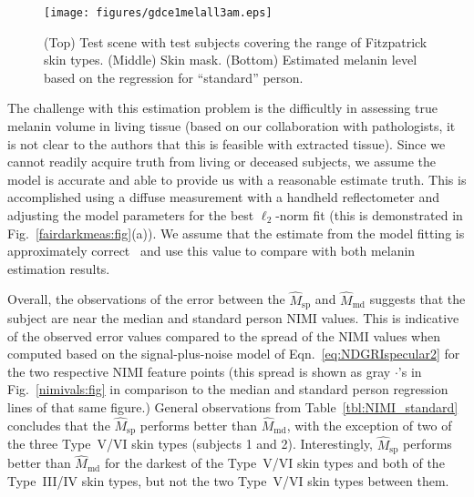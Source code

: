 \documentclass[10pt,journal,cspaper,compsoc]{IEEEtran}
\begin{document}
\begin{figure}[ht!]
\centering
\texttt{[image: figures/gdce1melall3am.eps]}
\caption{
(Top) Test scene with test subjects covering the range of Fitzpatrick skin types.
(Middle) Skin mask.
(Bottom) Estimated melanin level based on the regression for ``standard'' person.} 
\label{gdce1melall:fig}
\end{figure}

The challenge with this estimation problem is the difficultly in assessing true melanin volume in living tissue 
(based on our collaboration with pathologists, it is not clear to the authors that this is feasible with extracted tissue).  
Since we cannot readily acquire truth from living or deceased subjects, we assume the model is accurate and able to 
provide us with a reasonable estimate truth.  This is accomplished using a diffuse measurement with a handheld reflectometer
and adjusting the model parameters for the best $\ell_2$-norm fit (this is demonstrated in Fig.~\ref{fairdarkmeas:fig}(a)).  
We assume that the estimate from the model fitting is approximately correct~\cite{Nunez8} and use this value to compare with 
both melanin estimation results.

Overall, the observations of the error between the $\hat{M}_{\text{sp}}$ and $\hat{M}_{\text{md}}$ suggests that the 
subject are near the median and standard person NIMI values. This is indicative of the observed error values 
compared to the spread of the NIMI values when computed based on the signal-plus-noise model of Eqn.~\ref{eq:NDGRIspecular2} 
for the two respective NIMI feature points (this spread is shown as gray $\cdot$'s in Fig.~\ref{nimivals:fig} 
in comparison to the median and standard person regression lines of that same figure.)  General observations 
from Table~\ref{tbl:NIMI_standard} concludes that the $\hat{M}_{\text{sp}}$ performs better than $\hat{M}_{\text{md}}$, with 
the exception of two of the three Type~V/VI skin types (subjects 1 and 2).  
Interestingly, $\hat{M}_{\text{sp}}$ performs better than $\hat{M}_{\text{md}}$ for the darkest of the Type~V/VI skin types 
and both of the Type~III/IV skin types, but not the two Type~V/VI skin types between them.  
\end{document}

